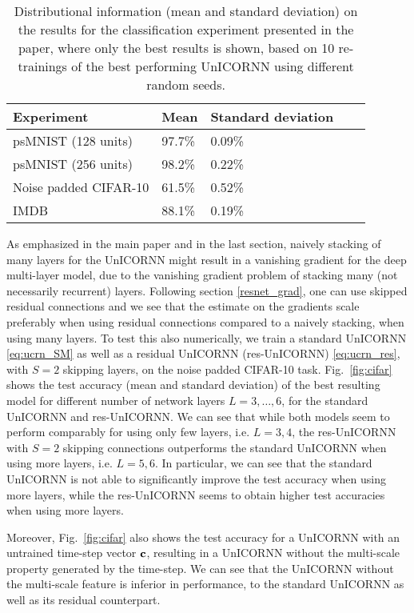 \documentclass{article}
\newcommand{\bc}{{\bf c}}
\newcommand{\fref}[1] {Fig.~\ref{#1}}
\begin{document}
\begin{table}[h!]
  \caption{Distributional information (mean and standard deviation) on the results for the classification experiment presented in the paper, where only the best results is shown, based on 10 re-trainings of the best performing UnICORNN using different random seeds.}
  \label{tab:distr_results}
  \centering
  \begin{tabular}{lllll}
    \toprule
    \cmidrule(r){1-3}
    Experiment & Mean & Standard deviation \\
        \midrule
    psMNIST (128 units) & 97.7\% &  0.09\%\\
    psMNIST (256 units) & 98.2\% & 0.22\% \\
    Noise padded CIFAR-10 & 61.5\% & 0.52\%\\
    IMDB & 88.1\% & 0.19\% \\
    \bottomrule
  \end{tabular}
\end{table}

As emphasized in the main paper and in the last section, naively stacking of many layers for the UnICORNN might result in a vanishing gradient for the deep multi-layer model, due to the vanishing gradient problem of stacking many (not necessarily recurrent) layers. Following section \ref{resnet_grad}, one can use skipped residual connections and we see that the estimate on the gradients scale preferably when using residual connections compared to a naively stacking, when using many layers. To test this also numerically, we train a standard UnICORNN \eqref{eq:ucrn_SM} as well as a residual UnICORNN (res-UnICORNN) \eqref{eq:ucrn_res}, with $S=2$ skipping layers, on the noise padded CIFAR-10 task.  
\fref{fig:cifar} shows the test accuracy (mean and standard deviation) of the best resulting model for different number of network layers $L=3,\dots,6$, for the standard UnICORNN and res-UnICORNN. We can see that while both models seem to perform comparably for using only few layers, i.e. $L=3,4$, the res-UnICORNN with $S=2$ skipping connections outperforms the standard UnICORNN when using more layers, i.e. $L=5,6$. In particular, we can see that the standard UnICORNN is not able to significantly improve the test accuracy when using more layers, while the res-UnICORNN seems to obtain higher test accuracies when using more layers. 

Moreover, \fref{fig:cifar} also shows the test accuracy for a UnICORNN with an untrained time-step vector $\bc$, resulting in a UnICORNN without the multi-scale property generated by the time-step. We can see that the UnICORNN without the multi-scale feature is inferior in performance, to the standard UnICORNN as well as its residual counterpart.   
\end{document}
